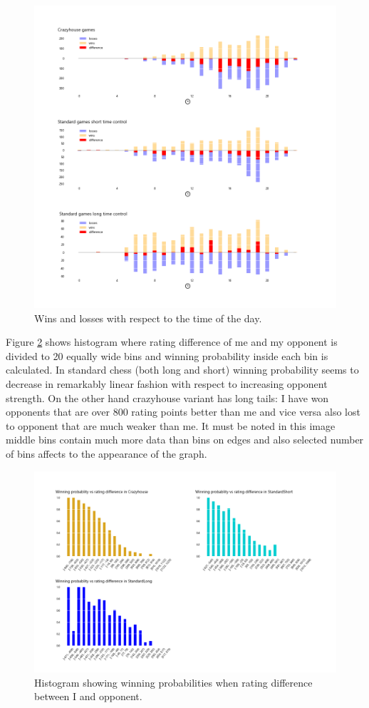 \begin{figure}[ht!]
    \includegraphics[width=\textwidth]{../img/games_vs_time_of_day.png}
    \caption{Wins and losses with respect to the time of the day.}
    \label{fig:games vs time of day}
\end{figure}

Figure \ref{fig:winning probabilities} shows histogram where rating difference of me and my opponent is divided to 20 equally wide bins and winning probability inside each bin is calculated. In standard chess (both long and short) winning probability seems to decrease in remarkably linear fashion with respect to increasing opponent strength. On the other hand crazyhouse variant has long tails: I have won opponents that are over 800 rating points better than me and vice versa also lost to opponent that are much weaker than me. It must be noted in this image middle bins contain much more data than bins on edges and also selected number of bins affects to the appearance of the graph.

\begin{figure}[ht!]
    \includegraphics[width=\textwidth]{../img/winning_probabilities_vs_rating.png}
    \caption{Histogram showing winning probabilities when rating difference between I and opponent.}
    \label{fig:winning probabilities}
\end{figure}